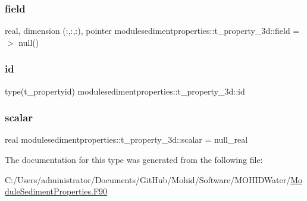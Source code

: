 \subsubsection{\texorpdfstring{field}{field}}
{\footnotesize\ttfamily real, dimension (\+:,\+:,\+:), pointer modulesedimentproperties\+::t\+\_\+property\+\_\+3d\+::field =$>$ null()\hspace{0.3cm}{\ttfamily [private]}}

\mbox{\label{structmodulesedimentproperties_1_1t__property__3d_aa01a15af4826867105cf27d563b9f658}} 
\subsubsection{\texorpdfstring{id}{id}}
{\footnotesize\ttfamily type(t\+\_\+propertyid) modulesedimentproperties\+::t\+\_\+property\+\_\+3d\+::id\hspace{0.3cm}{\ttfamily [private]}}

\mbox{\label{structmodulesedimentproperties_1_1t__property__3d_a10a1a3bafbe76a5b772499e98caeea14}} 
\subsubsection{\texorpdfstring{scalar}{scalar}}
{\footnotesize\ttfamily real modulesedimentproperties\+::t\+\_\+property\+\_\+3d\+::scalar = null\+\_\+real\hspace{0.3cm}{\ttfamily [private]}}



The documentation for this type was generated from the following file\+:\begin{DoxyCompactItemize}
\item 
C\+:/\+Users/administrator/\+Documents/\+Git\+Hub/\+Mohid/\+Software/\+M\+O\+H\+I\+D\+Water/\mbox{\hyperlink{_module_sediment_properties_8_f90}{Module\+Sediment\+Properties.\+F90}}\end{DoxyCompactItemize}
